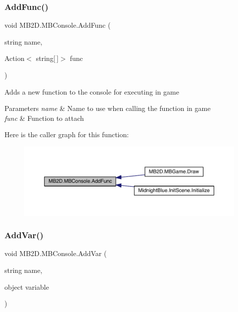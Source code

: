 \subsubsection{\texorpdfstring{Add\+Func()}{AddFunc()}}
{\footnotesize\ttfamily void M\+B2\+D.\+M\+B\+Console.\+Add\+Func (\begin{DoxyParamCaption}\item[{string}]{name,  }\item[{Action$<$ string\mbox{[}$\,$\mbox{]}$>$}]{func }\end{DoxyParamCaption})\hspace{0.3cm}{\ttfamily [inline]}}



Adds a new function to the console for executing in game 


\begin{DoxyParams}{Parameters}
{\em name} & Name to use when calling the function in game\\
\hline
{\em func} & Function to attach\\
\hline
\end{DoxyParams}
Here is the caller graph for this function\+:\nopagebreak
\begin{figure}[H]
\begin{center}
\leavevmode
\includegraphics[width=350pt]{class_m_b2_d_1_1_m_b_console_a3c515ad4a199b0b67049df57fce7cb3f_icgraph}
\end{center}
\end{figure}
\hypertarget{class_m_b2_d_1_1_m_b_console_aeff7888e763a415aeccadc347e09828d}{}\label{class_m_b2_d_1_1_m_b_console_aeff7888e763a415aeccadc347e09828d} 
\subsubsection{\texorpdfstring{Add\+Var()}{AddVar()}}
{\footnotesize\ttfamily void M\+B2\+D.\+M\+B\+Console.\+Add\+Var (\begin{DoxyParamCaption}\item[{string}]{name,  }\item[{object}]{variable }\end{DoxyParamCaption})\hspace{0.3cm}{\ttfamily [inline]}}




